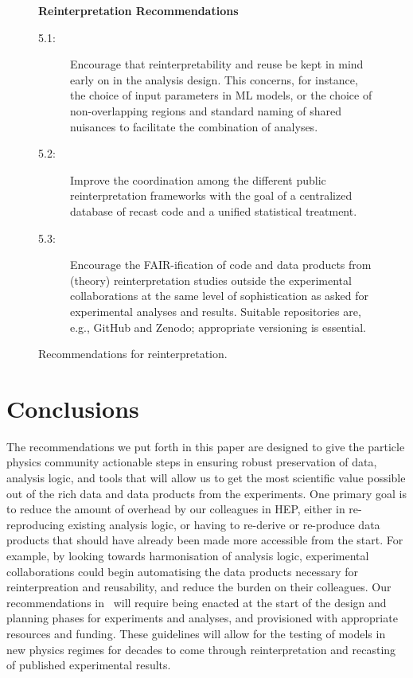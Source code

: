 \documentclass[11pt]{article}
\begin{document}
\begin{figure}[!ht]
\begin{tcolorbox}
\begin{center}
{\large \textbf{Reinterpretation Recommendations}}
\end{center}
%
\begin{description}
   \item[5.1:] Encourage that reinterpretability and reuse be kept in mind early on in the analysis design. This concerns, for instance, the choice of input parameters in \gls{ML} models, or the choice of non-overlapping regions and standard naming of shared nuisances to facilitate the combination of analyses.
   \item[5.2:] Improve the coordination among the different public reinterpretation frameworks  with the goal of a centralized database of recast code and a unified statistical treatment.
   \item[5.3:] Encourage the \gls{FAIR}-ification of code and \glspl{data product} from (theory) reinterpretation studies outside the experimental collaborations at the same level of sophistication as asked for experimental analyses and results. Suitable repositories are, e.g., GitHub and Zenodo; appropriate versioning is essential.
\end{description}
\end{tcolorbox}
\caption{Recommendations for reinterpretation.}
\label{fig:recs_reinterpretation}
\end{figure}

\section{Conclusions}

The recommendations we put forth in this paper are designed to give the particle physics community actionable steps in ensuring robust preservation of data, analysis logic, and tools that will allow us to get the most scientific value possible out of the rich data and data products from the experiments.
One primary goal is to reduce the amount of overhead by our colleagues in \gls{HEP}, either in re-reproducing existing analysis logic, or having to re-derive or re-produce data products that should have already been made more accessible from the start.
For example, by looking towards harmonisation of analysis logic, experimental collaborations could begin automatising the data products necessary for reinterpreation and reusability, and reduce the burden on their colleagues.
Our recommendations in~ will require being enacted at the start of the design and planning phases for experiments and analyses, and provisioned with appropriate resources and funding. These guidelines will allow for the testing of models in new physics regimes for decades to come through reinterpretation and recasting of published experimental results.
\end{document}
